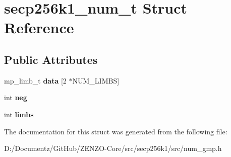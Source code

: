 \hypertarget{structsecp256k1__num__t}{}\section{secp256k1\+\_\+num\+\_\+t Struct Reference}
\label{structsecp256k1__num__t}
\subsection*{Public Attributes}
\begin{DoxyCompactItemize}
\item 
\mbox{\label{structsecp256k1__num__t_a065d2990a2593fc614acdb03eb2d8ccd}} 
mp\+\_\+limb\+\_\+t {\bfseries data} \mbox{[}2 $\ast$N\+U\+M\+\_\+\+L\+I\+M\+BS\mbox{]}
\item 
\mbox{\label{structsecp256k1__num__t_a4ad0e79d257b25a800bbc6cf4d3b45a8}} 
int {\bfseries neg}
\item 
\mbox{\label{structsecp256k1__num__t_a30a7b1070d6d8b9d03a3a21851c06e13}} 
int {\bfseries limbs}
\end{DoxyCompactItemize}


The documentation for this struct was generated from the following file\+:\begin{DoxyCompactItemize}
\item 
D\+:/\+Documentz/\+Git\+Hub/\+Z\+E\+N\+Z\+O-\/\+Core/src/secp256k1/src/num\+\_\+gmp.\+h\end{DoxyCompactItemize}
